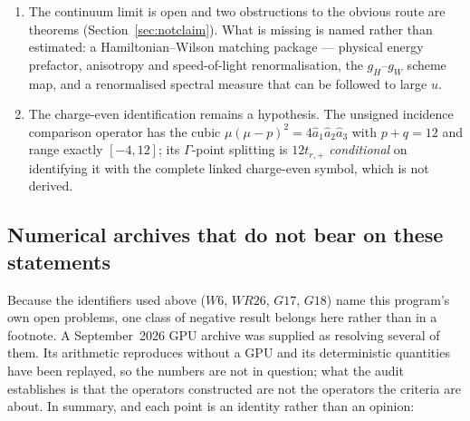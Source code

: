 \documentclass[11pt]{article}
\theoremstyle{definition}
\theoremstyle{remark}
\begin{document}
\begin{enumerate}
  on it, and it does not supply a continuum limit.
\item The continuum limit is open and two obstructions to the obvious route
  are theorems (Section~\ref{sec:notclaim}). What is missing is named rather
  than estimated: a Hamiltonian--Wilson matching package --- physical energy
  prefactor, anisotropy and speed-of-light renormalisation, the
  $g_H$--$g_W$ scheme map, and a renormalised spectral measure that can be
  followed to large $u$.
\item The charge-even identification remains a hypothesis. The unsigned
  incidence comparison operator has the cubic $\mu(\mu-p)^2=4\hat a_1\hat
  a_2\hat a_3$ with $p+q=12$ and range exactly $[-4,12]$; its $\Gamma$-point
  splitting is $12t_{r,+}$ \emph{conditional} on identifying it with the
  complete linked charge-even symbol, which is not derived.
\end{enumerate}

\subsection{Numerical archives that do not bear on these statements}

Because the identifiers used above ($W6$, $WR26$, $G17$, $G18$) name this
program's own open problems, one class of negative result belongs here rather
than in a footnote. A September~2026 GPU archive was supplied as resolving
several of them. Its arithmetic reproduces without a GPU and its deterministic
quantities have been replayed, so the numbers are not in question; what the
audit establishes is that the operators constructed are not the operators the
criteria are about. In summary, and each point is an identity rather than an
opinion:
\end{document}
